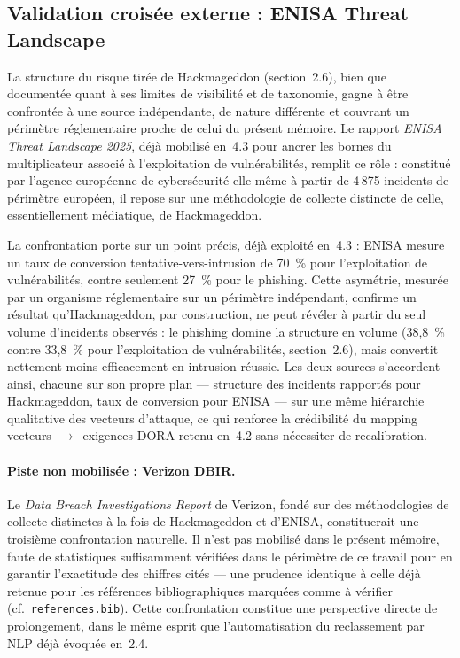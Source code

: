 \documentclass[11pt,a4paper]{article}
\theoremstyle{navystyle}
\theoremstyle{navydef}
\begin{document}
\subsection{Validation croisée externe : ENISA Threat Landscape}

La structure du risque tirée de Hackmageddon (section~2.6), bien que
documentée quant à ses limites de visibilité et de taxonomie, gagne à être
confrontée à une source indépendante, de nature différente et couvrant un
périmètre réglementaire proche de celui du présent mémoire. Le rapport
\emph{ENISA Threat Landscape 2025}, déjà mobilisé en~4.3 pour ancrer les
bornes du multiplicateur associé à l'exploitation de vulnérabilités, remplit
ce rôle : constitué par l'agence européenne de cybersécurité elle-même à
partir de 4\,875 incidents de périmètre européen, il repose sur une
méthodologie de collecte distincte de celle, essentiellement médiatique, de
Hackmageddon.

La confrontation porte sur un point précis, déjà exploité en~4.3 : ENISA
mesure un taux de conversion tentative-vers-intrusion de 70~\% pour
l'exploitation de vulnérabilités, contre seulement 27~\% pour le phishing.
Cette asymétrie, mesurée par un organisme réglementaire sur un périmètre
indépendant, confirme un résultat qu'Hackmageddon, par construction, ne peut
révéler à partir du seul volume d'incidents observés : le phishing domine la
structure en volume (38{,}8~\% contre 33{,}8~\% pour l'exploitation de
vulnérabilités, section~2.6), mais convertit nettement moins efficacement en
intrusion réussie. Les deux sources s'accordent ainsi, chacune sur son propre
plan --- structure des incidents rapportés pour Hackmageddon, taux de
conversion pour ENISA --- sur une même hiérarchie qualitative des vecteurs
d'attaque, ce qui renforce la crédibilité du mapping vecteurs~$\rightarrow$~exigences
DORA retenu en~4.2 sans nécessiter de recalibration.

\paragraph{Piste non mobilisée : Verizon DBIR.} Le \emph{Data Breach
Investigations Report} de Verizon, fondé sur des méthodologies de collecte
distinctes à la fois de Hackmageddon et d'ENISA, constituerait une troisième
confrontation naturelle. Il n'est pas mobilisé dans le présent mémoire, faute
de statistiques suffisamment vérifiées dans le périmètre de ce travail pour
en garantir l'exactitude des chiffres cités --- une prudence identique à
celle déjà retenue pour les références bibliographiques marquées comme à
vérifier (cf.~\texttt{references.bib}). Cette confrontation constitue une
perspective directe de prolongement, dans le même esprit que l'automatisation
du reclassement par NLP déjà évoquée en~2.4.
\end{document}
